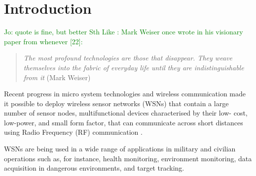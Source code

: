 \chapter{Introduction}

\textcolor{green}{Jo: quote is fine, but better Sth Like : Mark Weiser once
wrote in his visionary paper from whenever [22]:}

\begin{quote}
\emph{The most profound technologies are those that disappear. They weave
themselves into the fabric of everyday life until they are indistinguishable
from it} (Mark Weiser)

\end{quote}

Recent progress in micro system technologies and wireless communication
made it possible to deploy wireless sensor networks (WSNs) that contain a large
number of sensor nodes, multifunctional devices characterised by their low- cost,
low-power, and small form factor, that can communicate across short distances
using Radio Frequency (RF) communication \cite{SensorSurveyAkyildiz:2002}.

WSNs are being used in a wide range of applications in military and civilian
operations such as, for instance, health monitoring, environment monitoring,
data acquisition in dangerous environments, and target tracking.

